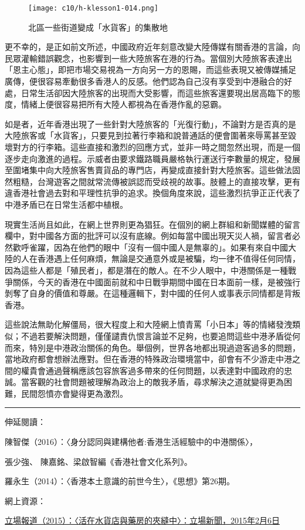 \begin{figure}[htbp]
    \centering
    \texttt{[image: c10/h-klesson1-014.png]}
    \caption{北區一些街道變成「水貨客」的集散地} 
\end{figure}

更不幸的，是正如前文所述，中國政府近年刻意改變大陸傳媒有關香港的言論，向民眾灌輸錯誤觀念，也影響到一些大陸旅客在港的行為。當個別大陸旅客表達出「恩主心態」，即把市場交易視為一方向另一方的恩賜，而這些表現又被傳媒捕足廣傳，便很容易牽動很多香港人的反感。他們認為自己沒有享受到中港融合的好處，日常生活卻因大陸旅客的出現而大受影響，而這些旅客還要現出居高臨下的態度，情緒上便很容易把所有大陸人都視為在香港作亂的惡霸。

如是者，近年香港出現了一些針對大陸旅客的「光復行動」，不論對方是否真的是大陸旅客或「水貨客」，只要見到拉著行李箱和說普通話的便會圍著來辱罵甚至毀壞對方的行李箱。這些直接和激烈的回應方式，並非一時之間忽然出現，而是一個逐步走向激進的過程。示威者由要求鐵路職員嚴格執行運送行李數量的規定，發展至圍堵集中向大陸旅客售賣貨品的專門店，再變成直接針對大陸旅客。這些做法固然粗糙，台灣遊客之間就常流傳被誤認而受歧視的故事。肢體上的直接攻擊，更有違香港社會過去對和平理性抗爭的追求。換個角度來說，這些激烈抗爭正正代表了中港矛盾已在日常生活都中植根。

現實生活尚且如此，在網上世界則更為猖狂。在個別的網上群組和新聞媒體的留言欄中，對中國各方面的批評可以沒有底線。例如每當中國出現天災人禍，留言者必然歡呼雀躍，因為在他們的眼中「沒有一個中國人是無辜的」。如果有來自中國大陸的人在香港遇上任何麻煩，無論是交通意外或是被騙，均一律不值得任何同情，因為這些人都是「殖民者」，都是潛在的敵人。在不少人眼中，中港關係是一種戰爭關係，今天的香港在中國面前就和中日戰爭期間中國在日本面前一樣，是被強行剝奪了自身的價值和尊嚴。在這種邏輯下，對中國的任何人或事表示同情都是背叛香港。

這些說法無助化解僵局，很大程度上和大陸網上憤青罵「小日本」等的情緒發洩類似；不過若要解決問題，僅僅譴責仇恨言論並不足夠，也要追問這些中港矛盾從何而來，特別是中港政治關係的角色。舉個例，世界各地都出現過遊客過多的問題，當地政府都會想辦法應對。但在香港的特殊政治環境當中，卻會有不少游走中港之間的權貴會通過聲稱應該包容旅客過多帶來的任何問題，以表達對中國政府的忠誠。當客觀的社會問題被理解為政治上的敵我矛盾，尋求解決之道就變得更為困難，民間怨憤亦會變得更為激烈。

\rule[-10pt]{15cm}{0.05em}

伸延閱讀：

陳智傑（2016）：〈身分認同與建構他者:香港生活經驗中的中港關係〉，

張少強、 陳嘉銘、梁啟智編《香港社會文化系列》。

羅永生（2014）：〈香港本土意識的前世今生〉，《思想》第26期。

網上資源：

\href{https://thestandnews.com/society/上水貨客-5-活在水貨店與藥房的夾縫中/}{立場報道（2015）：〈活在水貨店與藥房的夾縫中〉：立場新聞，2015年2月6日}